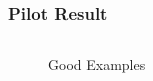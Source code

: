 \documentclass[aspectratio=169]{beamer}
\begin{document}
    \begin{frame}
        \frametitle{Pilot Result}
        \begin{columns}
            \begin{column}{.5\linewidth}
                \begin{figure}[htbp]
                    \centering
                    \quad
                    \caption{Good Examples}
                \end{figure}
            \end{column}
            \begin{column}{.5\linewidth}
                \begin{figure}[htbp]
                    \centering
                    \quad
\end{figure}
\end{column}
\end{columns}
\end{frame}
\end{document}
